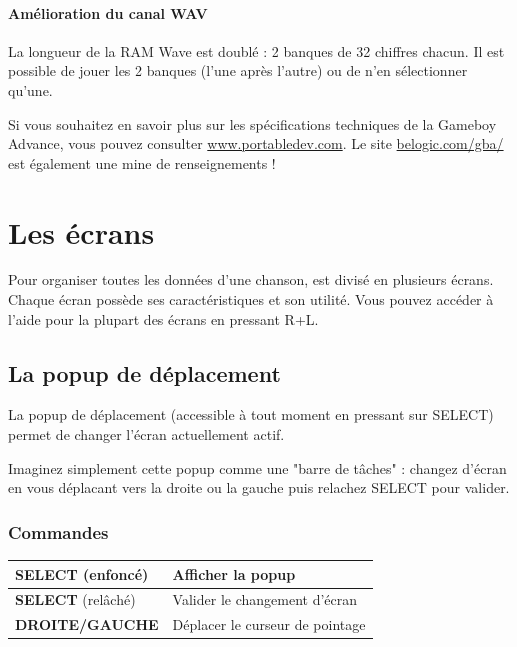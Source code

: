 \documentclass[12pt,a4paper]{article}
\begin{document}
            \paragraph{Amélioration du canal WAV} La longueur de la RAM Wave est doublé : 2 banques de 32 chiffres chacun. Il est possible de jouer les 2 banques (l'une après l'autre) ou de n'en sélectionner qu'une.
            
            \medskip
  Si vous souhaitez en savoir plus sur les spécifications techniques de la Gameboy Advance, vous pouvez consulter \href{http://www.portabledev.com/media/GBA/tutoriels/gbatek.htm}{www.portabledev.com}. Le site \href{http://belogic.com/gba/}{belogic.com/gba/} est également une mine de renseignements !
        
  \section{Les écrans}
  
    Pour organiser toutes les données d'une chanson, \FAT est divisé en plusieurs écrans. Chaque écran possède ses caractéristiques et son utilité. Vous pouvez accéder à l'aide pour la plupart des écrans en pressant R+L.
  
    \subsection{La popup de déplacement}
    
    La popup de déplacement (accessible à tout moment en pressant sur SELECT) permet de changer l'écran actuellement actif. 
    
    
    Imaginez simplement cette popup comme une "barre de tâches" : changez d'écran en vous déplacant vers la droite ou la gauche puis relachez SELECT pour valider.
    
        \subsubsection{Commandes}
        
        \tablelasttail{\hline}
        \begin{supertabular}{|l|l|}
        \hline
            {\bf SELECT} (enfoncé) & Afficher la popup \\
            \hline
            {\bf SELECT} (relâché) & Valider le changement d'écran \\
            \hline
            {\bf DROITE/GAUCHE} & Déplacer le curseur de pointage \\
        \hline
        \end{supertabular}
  
\end{document}
